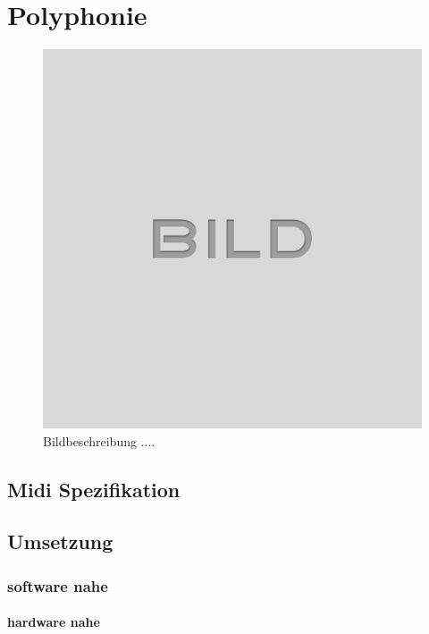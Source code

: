 
\chapter{Polyphonie}\label{chap.polyphonie}

\begin{figure}[H]
	\includegraphics[width=\textwidth]{images/idle.png}
	\caption{Bildbeschreibung ....}
	\label{fig.fm_}
\end{figure}

\section{Midi Spezifikation}\label{sect.fm_definition}

\section{Umsetzung}\label{sect.fm_DTP2}


\subsection{software nahe}\label{sect.fm_neu}
\subsubsection{hardware nahe}\label{sect.fm_neu.ansatz}

